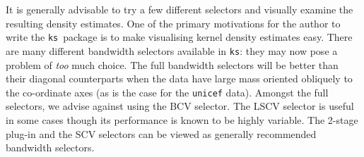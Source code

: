 \documentclass[a4paper,11pt]{article}
\def\ks{\texttt{ks}}
\begin{document}
It is generally advisable to try a few 
different selectors and visually examine the resulting density estimates. 
One of the primary motivations for the author to write the \ks \ package 
is to make visualising kernel density estimates easy.
There are many different bandwidth selectors available in \ks: they may
now pose a problem of \emph{too} much choice.
The full bandwidth selectors will be better than their diagonal counterparts
when the data have large mass oriented obliquely to the co-ordinate axes 
(as is the case for the \texttt{unicef} data). 
Amongst the full selectors, we advise against using the BCV selector. 
The LSCV selector is useful in some cases though its performance is 
known to be highly variable. The 2-stage plug-in and the SCV selectors
can be viewed as generally recommended bandwidth selectors.



%
\end{document}
